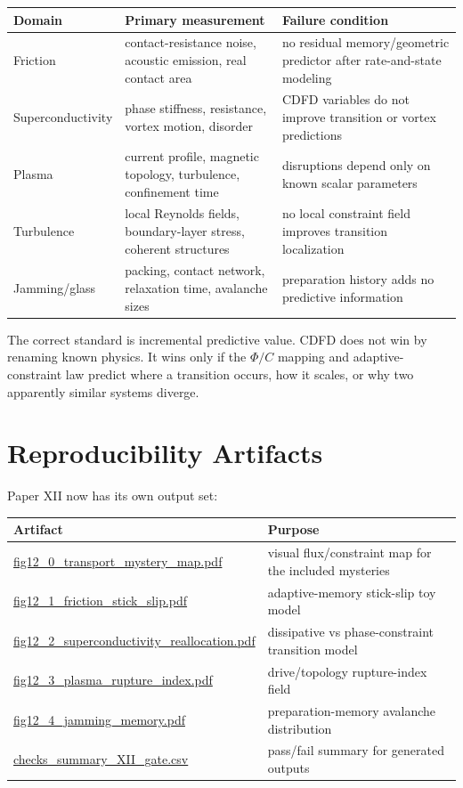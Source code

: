 \documentclass[11pt]{article}
\begin{document}
\begin{center}
\small
\begin{tabular}{L{0.22\textwidth}L{0.30\textwidth}L{0.34\textwidth}}
\toprule
\textbf{Domain} & \textbf{Primary measurement} & \textbf{Failure condition}\\
\midrule
Friction & contact-resistance noise, acoustic emission, real contact area & no residual memory/geometric predictor after rate-and-state modeling\\
Superconductivity & phase stiffness, resistance, vortex motion, disorder & CDFD variables do not improve transition or vortex predictions\\
Plasma & current profile, magnetic topology, turbulence, confinement time & disruptions depend only on known scalar parameters\\
Turbulence & local Reynolds fields, boundary-layer stress, coherent structures & no local constraint field improves transition localization\\
Jamming/glass & packing, contact network, relaxation time, avalanche sizes & preparation history adds no predictive information\\
\bottomrule
\end{tabular}
\end{center}

The correct standard is incremental predictive value. CDFD does not win by renaming known physics. It wins only if the $\Phi/C$ mapping and adaptive-constraint law predict where a transition occurs, how it scales, or why two apparently similar systems diverge.

\section{Reproducibility Artifacts}

Paper XII now has its own output set:
\begin{center}
\small
\begin{tabular}{L{0.42\textwidth}L{0.42\textwidth}}
\toprule
\textbf{Artifact} & \textbf{Purpose}\\
\midrule
\url{fig12_0_transport_mystery_map.pdf} & visual flux/constraint map for the included mysteries\\
\url{fig12_1_friction_stick_slip.pdf} & adaptive-memory stick-slip toy model\\
\url{fig12_2_superconductivity_reallocation.pdf} & dissipative vs phase-constraint transition model\\
\url{fig12_3_plasma_rupture_index.pdf} & drive/topology rupture-index field\\
\url{fig12_4_jamming_memory.pdf} & preparation-memory avalanche distribution\\
\url{checks_summary_XII_gate.csv} & pass/fail summary for generated outputs\\
\bottomrule
\end{tabular}
\end{center}
\end{document}
